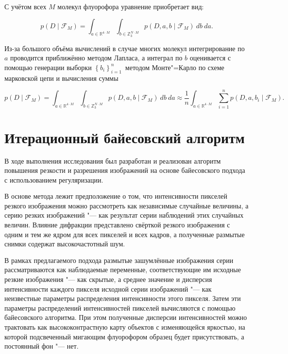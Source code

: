 С учётом всех $M$ молекул флуорофора уравнение приобретает вид:

\begin{equation*}
	p\left(D\middle|\mathcal{F}_M\right)=\int_{a\in\mathbb{R}^{4 \cdot M}}\int_{b\in\mathbb{Z}_3^{N \cdot M}}{p\left(D,a,b\middle|\mathcal{F}_M\right)\ db\ da}.
\end{equation*}	

Из-за большого объёма вычислений в случае многих молекул интегрирование по $a$ проводится приближённо методом Лапласа, а интеграл по $b$ оценивается с помощью генерации выборки $\left\{b_i\right\}_{i=1\ }^n$ методом Монте"=Карло по схеме марковской цепи и вычисления суммы

\begin{equation*}
	p\left(D\middle|\mathcal{F}_M\right)=\int_{a\in\mathbb{R}^{4 \cdot M}}\int_{b\in\mathbb{Z}_3^{N \cdot M}}{p\left(D,a,b\middle|\mathcal{F}_M\right)\ db\ da} \approx \frac{1}{n}\int_{a\in\mathbb{R}^{4 \cdot M}}{\sum_{i=1}^{n}{p\left(D,a,b_i\middle|\mathcal{F}_M\right)}}.
\end{equation*}

\section{Итерационный байесовский алгоритм}

В ходе выполнения исследования был разработан и реализован алгоритм повышения резкости и разрешения изображений на основе байесовского подхода с использованием регуляризации.

В основе метода лежит предположение о том, что интенсивности пикселей резкого изображения можно рассмотреть как независимые случайные величины, а серию резких изображений "--- как результат серии наблюдений этих случайных величин. Влияние дифракции представлено свёрткой резкого изображения с одним и тем же ядром для всех пикселей и всех кадров, а полученные размытые снимки содержат высокочастотный шум.

В рамках предлагаемого подхода размытые зашумлённые изображения серии рассматриваются как наблюдаемые переменные, соответствующие им исходные резкие изображения "--- как скрытые, а среднее значение и дисперсия интенсивности каждого пикселя исходной серии изображений "--- как неизвестные параметры распределения интенсивности этого пикселя. Затем эти параметры распределений интенсивностей пикселей вычисляются с помощью байесовского алгоритма. При этом полученные дисперсии интенсивностей можно трактовать как высококонтрастную карту объектов с изменяющейся яркостью, на которой подсвеченный мигающим флуорофором образец будет присутствовать, а постоянный фон "--- нет.

